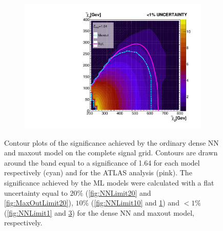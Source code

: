 \begin{figure}[H]
{\begin{subfigure}{.45\textwidth}
        \vspace{-0.75cm}
        \vspace*{-33.1ex}  %
        \begin{center}
        \tiny
        \hspace{-50.5ex}
        \cite{atlas_search_2021}
        \end{center}
        \vspace*{34.1ex}
        \vspace{-1.cm}
        \caption{}
        \label{fig:MaxOutLimit10}
    \end{subfigure}
    \hfill
    \begin{subfigure}{.45\textwidth}
        \includegraphics[width=\textwidth]{Figures/MLResults/NN/SUSY/Comparison/Limits/MaxOutLimit1.pdf}
        \vspace{-0.75cm}
        \vspace*{-33.1ex}  %
        \begin{center}
        \tiny
        \hspace{-50.5ex}
        \cite{atlas_search_2021}
        \end{center}
        \vspace*{34.1ex}
        \vspace{-1.cm}
        \caption{}
        \label{fig:MaxOutLimit1}
    \end{subfigure}
    }
    \caption[Contour plots 
    of the significance achieved by the ordinary dense \acs{NN} and maxout model on the complete signal grid. Contours are drawn 
    around the band equal to a significance of 1.64 for each model respectively (cyan) and for the \acs{ATLAS} analysis (pink).]{ Contour plots 
    of the significance achieved by the ordinary dense \acs{NN} and maxout model on the complete signal grid. Contours are drawn 
    around the band equal to a significance of 1.64 for each model respectively (cyan) and for the \acs{ATLAS} analysis \cite{atlas_search_2021} (pink). The 
    significance achieved by the \acs{ML} models were calculated with a flat uncertainty equal to $20\%$ (\ref{fig:NNLimit20} and \ref{fig:MaxOutLimit20}),
    $10\%$ (\ref{fig:NNLimit10} and \ref{fig:MaxOutLimit10}) and $<1\%$ (\ref{fig:NNLimit1} and \ref{fig:MaxOutLimit1}) for the dense \acs{NN} and maxout model,
    respectively.}
\end{figure}